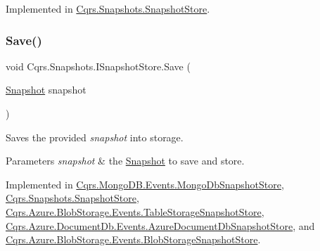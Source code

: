 Implemented in \hyperlink{classCqrs_1_1Snapshots_1_1SnapshotStore_af35423c44786c31d224d52c3796d0d3d_af35423c44786c31d224d52c3796d0d3d}{Cqrs.\+Snapshots.\+Snapshot\+Store}.

\mbox{\label{interfaceCqrs_1_1Snapshots_1_1ISnapshotStore_a6e99c620115ce8a0648a83bf2ce05527_a6e99c620115ce8a0648a83bf2ce05527}} 
\subsubsection{\texorpdfstring{Save()}{Save()}}
{\footnotesize\ttfamily void Cqrs.\+Snapshots.\+I\+Snapshot\+Store.\+Save (\begin{DoxyParamCaption}\item[{\hyperlink{classCqrs_1_1Snapshots_1_1Snapshot}{Snapshot}}]{snapshot }\end{DoxyParamCaption})}



Saves the provided {\itshape snapshot}  into storage. 


\begin{DoxyParams}{Parameters}
{\em snapshot} & the \hyperlink{classCqrs_1_1Snapshots_1_1Snapshot}{Snapshot} to save and store.\\
\hline
\end{DoxyParams}


Implemented in \hyperlink{classCqrs_1_1MongoDB_1_1Events_1_1MongoDbSnapshotStore_abd129099f8ed40c140ad2b39e730035a_abd129099f8ed40c140ad2b39e730035a}{Cqrs.\+Mongo\+D\+B.\+Events.\+Mongo\+Db\+Snapshot\+Store}, \hyperlink{classCqrs_1_1Snapshots_1_1SnapshotStore_ae96ea2bb89a0bd7f45544acc37107525_ae96ea2bb89a0bd7f45544acc37107525}{Cqrs.\+Snapshots.\+Snapshot\+Store}, \hyperlink{classCqrs_1_1Azure_1_1BlobStorage_1_1Events_1_1TableStorageSnapshotStore_a25ec7d179773aec79febdf0e8873b285_a25ec7d179773aec79febdf0e8873b285}{Cqrs.\+Azure.\+Blob\+Storage.\+Events.\+Table\+Storage\+Snapshot\+Store}, \hyperlink{classCqrs_1_1Azure_1_1DocumentDb_1_1Events_1_1AzureDocumentDbSnapshotStore_a52dd38e57e884db7529c8f57c3da7479_a52dd38e57e884db7529c8f57c3da7479}{Cqrs.\+Azure.\+Document\+Db.\+Events.\+Azure\+Document\+Db\+Snapshot\+Store}, and \hyperlink{classCqrs_1_1Azure_1_1BlobStorage_1_1Events_1_1BlobStorageSnapshotStore_afb32196428d4c92c9542a94a1764fa59_afb32196428d4c92c9542a94a1764fa59}{Cqrs.\+Azure.\+Blob\+Storage.\+Events.\+Blob\+Storage\+Snapshot\+Store}.

